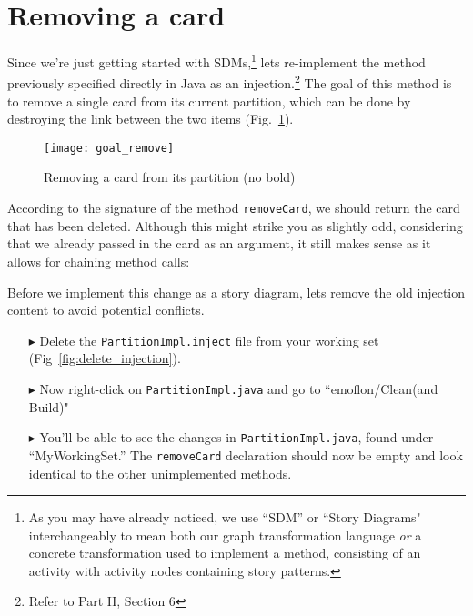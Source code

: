 \newpage
\genHeader
\section{Removing a card}
\hypertarget{sec:remCard}{}

Since we're just getting started with SDMs,\footnote{As you may have already noticed, we use ``SDM'' or ``Story Diagrams" interchangeably to mean both our graph
transformation language \emph{or} a concrete transformation used to implement a method, consisting of an activity with activity nodes containing story patterns.} lets
re-implement the method previously specified directly in Java as an injection.\footnote{Refer to Part II, Section 6} The goal of this method is to remove a single card from its current
partition, which can be done by destroying the link between the two items (Fig.~\ref{fig:goal_removeCard}).

\vspace{1cm}

\begin{figure}[htbp]
	\centering
    \texttt{[image: goal\_remove]}
	\caption{Removing a card from its partition \update (no bold)}
	\label{fig:goal_removeCard}
\end{figure}
\FloatBarrier

\vspace{0.5cm}

According to the signature of the method \texttt{removeCard}, we should return the card that has been deleted. Although this might strike you as slightly odd,
considering that we already passed in the card as an argument, it still makes sense as it allows for chaining method calls:

Before we implement this change as a story diagram, lets remove the old injection content to avoid potential conflicts.

\begin{itemize}

\item[$\blacktriangleright$] Delete the \texttt{PartitionImpl.inject} file from your working set (Fig~\ref{fig:delete_injection}).

\item[$\blacktriangleright$] Now right-click on \texttt{PartitionImpl.java} and go to ``emoflon/Clean(and Build)" 

\item[$\blacktriangleright$] You'll be able to see the changes in \texttt{PartitionImpl.java}, found under ``MyWorkingSet.'' The \texttt{removeCard}
declaration should now be empty and look identical to the other unimplemented methods.

\end{itemize}

